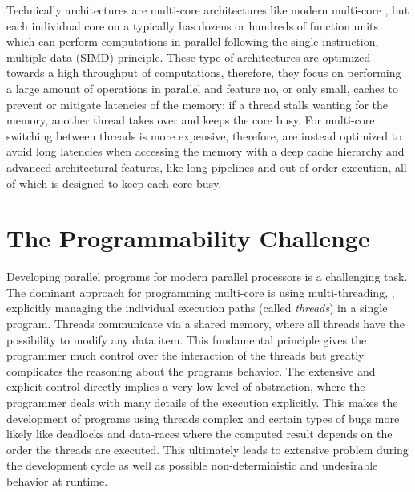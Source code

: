 Technically \GPU architectures are multi-core architectures like modern multi-core \CPUs, but each individual core on a \GPU typically has dozens or hundreds of function units which can perform computations in parallel following the single instruction, multiple data (SIMD) principle.
These type of architectures are optimized towards a high throughput of computations, therefore, they focus on performing a large amount of operations in parallel and feature no, or only small, caches to prevent or mitigate latencies of the memory:
if a thread stalls wanting for the memory, another thread takes over and keeps the core busy.
For multi-core \CPUs switching between threads is more expensive, therefore, \CPUs are instead optimized to avoid long latencies when accessing the memory with a deep cache hierarchy and advanced architectural features, like long pipelines and out-of-order execution, all of which is designed to keep each core busy.

\section{The Programmability Challenge}

Developing parallel programs for modern parallel processors is a challenging task.
The dominant approach for programming multi-core \CPUs is using multi-threading, \ie, explicitly managing the individual execution paths (called \emph{threads}) in a single program.
Threads communicate via a shared memory, where all threads have the possibility to modify any data item.
This fundamental principle gives the programmer much control over the interaction of the threads but greatly complicates the reasoning about the programs behavior.
The extensive and explicit control directly implies a very low level of abstraction, where the programmer deals with many details of the execution explicitly.
This makes the development of programs using threads complex and certain types of bugs more likely like deadlocks and data-races where the computed result depends on the order the threads are executed.
This ultimately leads to extensive problem during the development cycle as well as possible non-deterministic and undesirable behavior at runtime.

